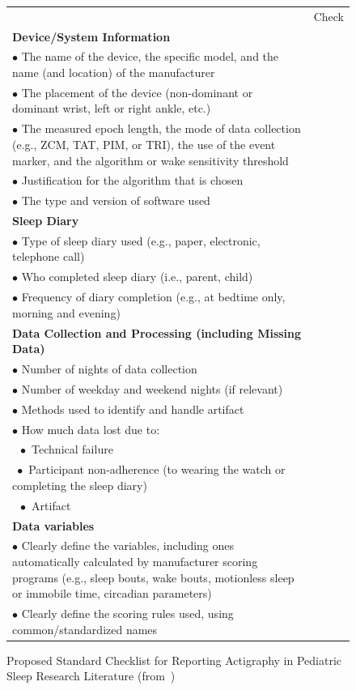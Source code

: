 \documentclass[a4paper,12pt]{article}
\newlength\savewidth
\newcommand\Ghline{%
	\noalign{\global\savewidth\arrayrulewidth\global\arrayrulewidth2pt}%
	\hline
	\noalign{\global\arrayrulewidth\savewidth}}
\begin{document}
\begin{figure}[H]
\centering
\begin{tabularx}{\textwidth}{|X|c|}
\hline
& Check \\
\Ghline
\textbf{Device/System Information} & \\
$\bullet$ The name of the device, the specific model, and the name (and location) of the manufacturer & \\
\hline
$\bullet$ The placement of the device (non-dominant or dominant wrist, left or right ankle, etc.) & \\
\hline
$\bullet$ The measured epoch length, the mode of data collection (e.g., ZCM, TAT, PIM, or TRI), the use of the event marker, and the algorithm or wake sensitivity threshold & \\
\hline
$\bullet$ Justification for the algorithm that is chosen & \\
\hline
$\bullet$ The type and version of software used & \\
\hline
\textbf{Sleep Diary} & \\
$\bullet$ Type of sleep diary used (e.g., paper, electronic, telephone call) & \\
\hline
$\bullet$ Who completed sleep diary (i.e., parent, child) & \\
\hline
$\bullet$ Frequency of diary completion (e.g., at bedtime only, morning and evening) & \\
\hline
\textbf{Data Collection and Processing (including Missing Data)} & \\
\hline
$\bullet$ Number of nights of data collection & \\
\hline
$\bullet$ Number of weekday and weekend nights (if relevant) & \\
\hline
$\bullet$ Methods used to identify and handle artifact & \\
\hline
$\bullet$ How much data lost due to: & \\
$\;\; \bullet$ Technical failure & \\
$\; \bullet$ Participant non-adherence (to wearing the watch or completing the sleep diary) & \\
$\;\; \bullet$ Artifact & \\
\hline
\textbf{Data variables} & \\
\hline
$\bullet$ Clearly define the variables, including ones automatically calculated by manufacturer scoring programs (e.g., sleep bouts, wake bouts, motionless sleep or immobile time, circadian parameters) & \\
\hline
$\bullet$ Clearly define the scoring rules used, using common/standardized names & \\
\hline
\end{tabularx}
\caption{Proposed Standard Checklist for Reporting Actigraphy in Pediatric Sleep Research Literature (from~\cite{LisaJ.MeltzerHawleyE.Montgomery-DownsSalvatoreP.Insana2012})}
\label{checklistLisa}
\end{figure}
\end{document}
